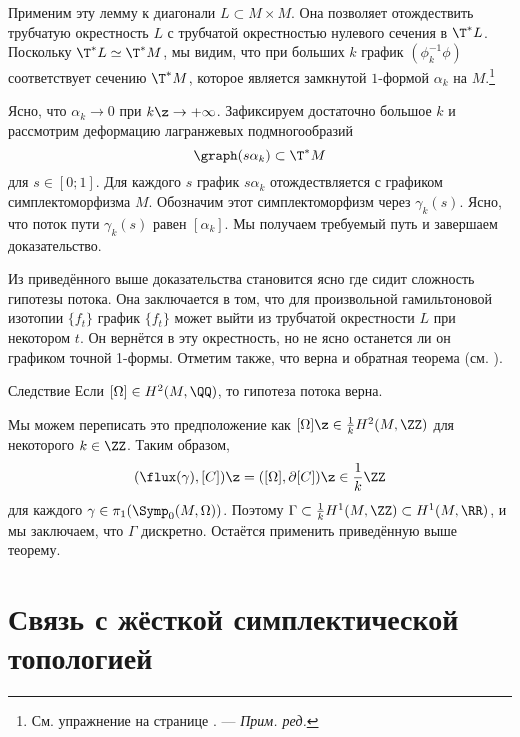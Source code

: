 Применим эту лемму к диагонали $L \subset M \times M$.
Она позволяет отождествить трубчатую окрестность $L$ с трубчатой
окрестностью нулевого сечения в $\T^\ast L$. 
Поскольку $\T^\ast L \simeq \T^\ast M$, мы видим, что при больших $k$
график $(\phi_k^{-1}\phi)$ соответствует сечению $\T^\ast M$, которое
является замкнутой $1$-формой $\alpha_k$ на
$M$.\footnote{См. упражнение на странице
  \pageref{1-form-lagrange}. — \textit{Прим. ред.}} 

Ясно, что $\alpha_k \to 0$ при $k\z\to +\infty$.
Зафиксируем достаточно большое $k$ и рассмотрим деформацию лагранжевых
подмногообразий  
\[\graph (s\alpha_k) \subset \T^\ast M\]
для $s \in [0;1]$.
Для каждого $s$ график $s\alpha_k$ отождествляется с графиком симплектоморфизма $M$.
Обозначим этот симплектоморфизм через $\gamma_k(s)$.
Ясно, что поток пути $\gamma_k(s)$ равен $[\alpha_k]$.
Мы получаем требуемый путь и завершаем доказательство.
\qeds

Из приведённого выше доказательства становится ясно где сидит
сложность гипотезы потока. 
Она заключается в том, что для произвольной гамильтоновой изотопии
$\{f_t\}$ график $\{f_t\}$ может выйти из трубчатой окрестности $L$
при некотором $t$. 
Он вернётся в эту окрестность, но не ясно останется ли он графиком
точной 1-формы. 
Отметим также, что верна и обратная теорема (см. \cite{LMP1}).

\begin{thm}{Следствие}
Если $[\Omega] \in H^2(M, \QQ)$, то гипотеза потока верна.
\end{thm}

Мы можем переписать это предположение как $[\Omega] \z\in
\tfrac1kH^2(M, \ZZ)$ для некоторого $k\in\ZZ$.
Таким образом,
\[(\flux(\gamma), [C]) \z= ([\Omega], \partial[C]) \z\in \frac1k\ZZ\]
для каждого $\gamma \in \pi_1(\Symp_0(M,\Omega))$. 
Поэтому $\Gamma\subset \tfrac1k H^1(M,\ZZ)\subset H^1(M,\RR)$, и мы
заключаем, что $\Gamma$ дискретно. 
Остаётся применить приведённую выше теорему.
\qeds

\section{Связь с жёсткой симплектической топологией}

